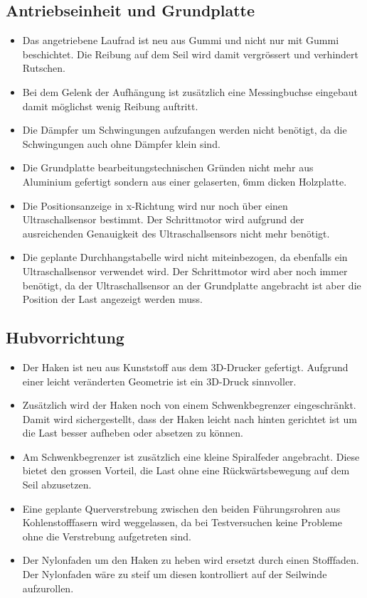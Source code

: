 \documentclass[a4paper]{report}
\begin{document}
\subsection{Antriebseinheit und Grundplatte}

\begin{itemize}
		\item Das angetriebene Laufrad ist neu aus Gummi und nicht nur mit Gummi beschichtet. Die Reibung auf dem Seil wird damit vergrössert und verhindert Rutschen.
		\item Bei dem Gelenk der Aufhängung ist zusätzlich eine Messingbuchse eingebaut damit möglichst wenig Reibung auftritt.
		\item Die Dämpfer um Schwingungen aufzufangen werden nicht benötigt, da die Schwingungen auch ohne Dämpfer klein sind.
		\item Die Grundplatte bearbeitungstechnischen Gründen nicht mehr aus Aluminium gefertigt sondern aus einer gelaserten, 6mm dicken Holzplatte.
		\item Die Positionsanzeige in x-Richtung wird nur noch über einen Ultraschallsensor bestimmt. Der Schrittmotor wird aufgrund der ausreichenden Genauigkeit des Ultraschallsensors nicht mehr benötigt.
		\item Die geplante Durchhangstabelle wird nicht miteinbezogen, da ebenfalls ein Ultraschallsensor verwendet wird. Der Schrittmotor wird aber noch immer benötigt, da der Ultraschallsensor an der Grundplatte angebracht ist aber die Position der Last angezeigt werden muss.
\end{itemize}

\subsection{Hubvorrichtung}

\begin{itemize}
		\item Der Haken ist neu aus Kunststoff aus dem 3D-Drucker gefertigt. Aufgrund einer leicht veränderten Geometrie ist ein 3D-Druck sinnvoller.
		\item Zusätzlich wird der Haken noch von einem Schwenkbegrenzer eingeschränkt. Damit wird sichergestellt, dass der Haken leicht nach hinten gerichtet ist um die Last besser aufheben oder absetzen zu können.
		\item Am Schwenkbegrenzer ist zusätzlich eine kleine Spiralfeder angebracht. Diese bietet den grossen Vorteil, die Last ohne eine Rückwärtsbewegung auf dem Seil abzusetzen.
		\item Eine geplante Querverstrebung zwischen den beiden Führungsrohren aus Kohlenstofffasern wird weggelassen, da bei Testversuchen keine Probleme ohne die Verstrebung aufgetreten sind.
		\item Der Nylonfaden um den Haken zu heben wird ersetzt durch einen Stofffaden. Der Nylonfaden wäre zu steif um diesen kontrolliert auf der Seilwinde aufzurollen.
\end{itemize}
\end{document}

